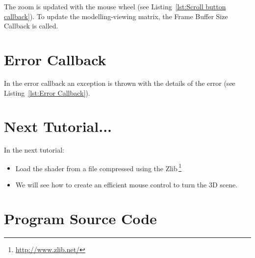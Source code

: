 \documentclass[11pt,oneside,a4paper,final]{article}
\begin{document}
The zoom is updated with the mouse wheel 
(see Listing~\ref{lst:Scroll button callback}). 
To update the modelling-viewing matrix, the Frame Buffer Size Callback is 
called.

\begin{center}

\end{center}


\section{Error Callback}
\label{sec:Error Callback}

In the error callback an exception is thrown with the details of the error 
(see Listing~\ref{lst:Error Callback}).

\begin{center}

\end{center}


\section{Next Tutorial...}

In the next tutorial:
\begin{itemize}
	\item Load the shader from a file compressed using 
		the Zlib\,\footnote{\url{http://www.zlib.net/}}
%  
% 
	\item We will see how to create an efficient mouse control to turn the 
		3D scene. 
% 
\end{itemize}



\appendix
\section{Program Source Code}
\label{sec:Program Source Code}

\begin{center}
  
\end{center}

% 
% 
\end{document}
